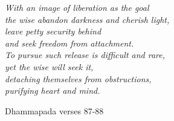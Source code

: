 
\cleartorecto
\begin{quotepage}{60mm}
\centering
\itshape
With an image of liberation as the goal\\
the wise abandon darkness and cherish light,\\
leave petty security behind \\
and seek freedom from attachment.\\
To pursue such release is difficult and rare, \\
yet the wise will seek it, \\
detaching themselves from obstructions,\\
purifying heart and mind.

{\smaller Dhammapada verses 87-88}
\end{quotepage}

